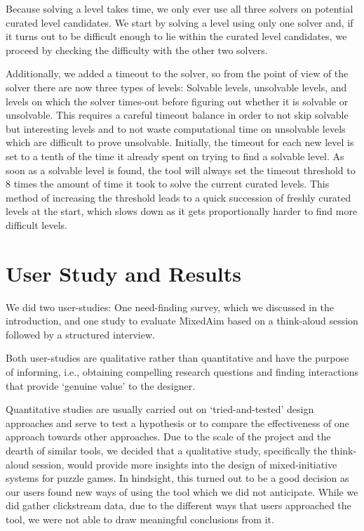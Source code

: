 Because solving a level takes time, we only ever use all three solvers on potential curated level candidates. We start by solving a level using only one solver and, if it turns out to be difficult enough to lie within the curated level candidates, we proceed by checking the difficulty with the other two solvers.

Additionally, we added a timeout to the solver, so from the point of view of the solver there are now three types of levels: Solvable levels, unsolvable levels, and levels on which the solver times-out before figuring out whether it is solvable or unsolvable.
This requires a careful timeout balance in order to not skip solvable but interesting levels and to not waste computational time on unsolvable levels which are difficult to prove unsolvable.
Initially, the timeout for each new level is set to a tenth of the time it already spent on trying to find a solvable level. As soon as a solvable level is found, the tool will always set the timeout threshold to 8 times the amount of time it took to solve the current curated levels. This method of increasing the threshold leads to a quick succession of freshly curated levels at the start, which slows down as it gets proportionally harder to find more difficult levels.


\chapter{User Study and Results}

We did two user-studies: One need-finding survey, which we discussed in the introduction, and one study to evaluate MixedAim based on a think-aloud session followed by a structured interview. 

Both user-studies are qualitative rather than quantitative and have the purpose of informing, i.e., obtaining compelling research questions and finding interactions that provide `genuine value' to the designer. 

Quantitative studies are usually carried out on `tried-and-tested' design approaches and serve to test a hypothesis or to compare the effectiveness of one approach towards other approaches.
Due to the scale of the project and the dearth of similar tools, we decided that a qualitative study, specifically the think-aloud session, would provide more insights into the design of mixed-initiative systems for puzzle games. In hindsight, this turned out to be a good decision as our users found new ways of using the tool which we did not anticipate.
While we did gather clickstream data, due to the different ways that users approached the tool, we were not able to draw meaningful conclusions from it. 

